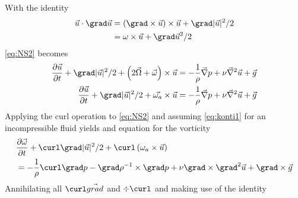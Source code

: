 \begin{fullwidth}
	

\begin{derivationNobreak}[Vorticity]\label{der:vort}
	With the identity
	\begin{equation}\begin{split}
	\vec{u} \cdot \grad \vec{u}
	&=
	\left( \grad \times  \vec{u}  \right)\times \vec{u}
	+ \grad \vert \vec{u}\vert ^{2}/2\\
	&=
	\omega \times \vec{u}
	+ \grad \vec{u}^{2}/2
	\end{split}\end{equation}
	\eqref{eq:NS2} becomes
	\begin{equation}\begin{split}
	\frac{\partial \vec{u}}{\partial t}
	+
	\grad \vert \vec{u}\vert ^{2}/2
	+
	\left( 2\vec{\Omega} + \vec{\omega} \right)  \times \vec{u}
	&=
	- \frac{1}{\rho} \vec{\nabla} p
	+
	\nu  \vec{\nabla}^{2} \vec{u}
	+
	\vec{g} \\
	\frac{\partial \vec{u}}{\partial t}
	+
	\grad \vert \vec{u}\vert ^{2}/2
	+
	\vec{\omega_{a}} \times \vec{u}
	&=
	- \frac{1}{\rho} \vec{\nabla} p
	+
	\nu  \vec{\nabla}^{2} \vec{u}
	+
	\vec{g}
	\end{split}\end{equation}
	Applying the curl operation to \eqref{eq:NS2} and assuming \eqref{eq:konti1}
	for	an incompressible fluid yields and equation for the vorticity
	\begin{equation}\begin{split}
	&\frac{\partial \vec{\omega}}{\partial t}
	+
	\curl \grad \vert \vec{u}\vert ^{2}/2
	+
	\curl \left( \omega_{a} \times \vec{u} \right) \\
	&=
	-\frac{1}{\rho} \curl \grad p
	-
	\grad \rho^{-1} \times \grad p
	+
	\nu \grad \times \grad^{2} \vec{u}
	+
	\grad \times \vec{g} \label{eq:vort1}
	\end{split}\end{equation}
	Annihilating all $\curl \vec{grad}$ and $\div \curl$ and making use of
	the
	identity

\end{derivationNobreak}
\end{fullwidth}

